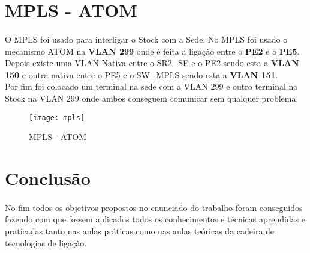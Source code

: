\documentclass[11pt]{article}
\begin{document}
        \large	
	\section{MPLS - ATOM}
	\normalsize
        \paragraph{}
        O MPLS foi usado para interligar o Stock com a Sede. No MPLS foi usado o mecanismo ATOM na \textbf{VLAN 299} onde é feita a ligação entre o \textbf{PE2} e o \textbf{PE5}. Depois existe uma VLAN Nativa entre o SR2\_SE e o PE2 sendo esta a \textbf{VLAN 150} e outra nativa entre o PE5 e o SW\_MPLS sendo esta a \textbf{VLAN 151}.\\ Por fim foi colocado um terminal na sede com a VLAN 299 e outro terminal no Stock na VLAN 299 onde ambos conseguem comunicar sem qualquer problema.

        \begin{figure}[h]
          \centering
          \texttt{[image: mpls]}
          \caption{MPLS - ATOM}
          \label{fig.nav}
	\end{figure}



    \pagebreak
	\large
	\section{Conclusão}
	\normalsize
	\paragraph{}
	No fim todos os objetivos propostos no enunciado do trabalho foram conseguidos fazendo com que fossem aplicados todos os conhecimentos e técnicas aprendidas e praticadas tanto nas aulas práticas como nas aulas teóricas da cadeira de tecnologias de ligação.
\end{document}
